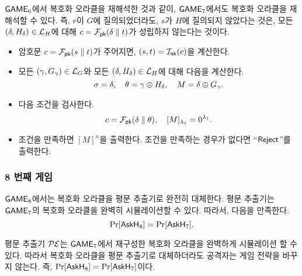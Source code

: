 \begin{memo}
	$\textsf{GAME}_6$에서 복호화 오라클을 재해석한 것과 같이, $\textsf{GAME}_7$에서도 복호화
	오라클을 재해석할 수 있다. 즉, $r$이 $G$에 질의되었더라도, $s$가 $H$에
	질의되지 않았다는 것은, 모든 $(\delta, H_{\delta}) \in \mathcal{L}_H$에 대해 $c =
	\mathcal{F}_{\textsf{pk}}(\delta \parallel t)$가 성립하지 않는다는 것이다. 
	\begin{tcolorbox}
		\begin{itemize}
			\item 암호문 $c = \mathcal{F}_{\textsf{pk}}(s \parallel t)$가 주어지면, $(s,t) =
			\mathcal{I}_{\textsf{sk}}(c)$을 계산한다.
			\item 모든 $(\gamma, G_\gamma) \in \mathcal{L}_G$와 모든 $(\delta,
			H_{\delta}) \in \mathcal{L}_H$에 대해 다음을 계산한다.
			$$
				\sigma = \delta, \quad \theta = \gamma \oplus H_{\delta}, \quad M = \delta \oplus G_{\gamma}.
			$$
			\item 다음 조건을 검사한다.
			$$
				c = \mathcal{F}_{\textsf{pk}}(\delta \parallel \theta), \quad [M]_{\lambda_1} = 0^{\lambda_1}.
			$$
			\item 조건을 만족하면 $[M]^{n}$을 출력한다. 조건을 만족하는
			경우가 없다면 “$\textsf{Reject}$”를 출력한다.
		\end{itemize}
	\end{tcolorbox}
\end{memo}

\newpage
\subsubsection{8 번째 게임}

$\textsf{GAME}_8$에서는 복호화 오라클을 평문 추출기로 완전히 대체한다. 평문 추출기는
$\textsf{GAME}_7$의 복호화 오라클을 완벽히 시뮬레이션할 수 있다. 따라서, 다음을
만족한다.
$$
	\Pr[\textsf{AskH}_8] = \Pr[\textsf{AskH}_7].
$$

\begin{memo}
	평문 추출기 $\mathcal{PE}$는 $\textsf{GAME}_7$에서 재구성한 복호화 오라클을 완벽하게
	시뮬레이션 할 수 있다. 따라서 복호화 오라클을 평문 추출기로 대체하더라도
	공격자는 게임 전략을 바꾸지 않는다. 즉, $\Pr[\textsf{AskH}_8] = \Pr[\textsf{AskH}_7]$이다.
\end{memo}


